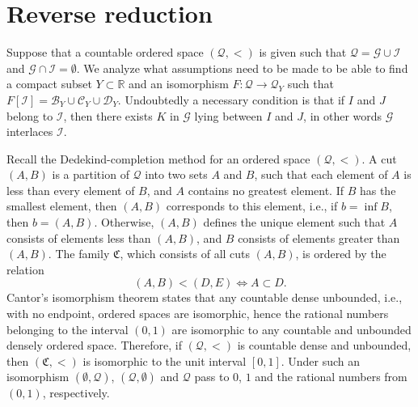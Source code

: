 \documentclass[12pt,a4paper,leqno]{amsart}
\theoremstyle{definition}
\begin{document}
   \section{Reverse reduction} 
  Suppose that a countable  ordered space $(\mathcal Q, <)$ is given such that $\mathcal Q = \mathcal G \cup \mathcal I$ and 
$\mathcal G \cap \mathcal I =\emptyset$. We analyze what assumptions need to be made to be able to find a compact subset $Y\subset \mathbb R$ and an isomorphism $F: \mathcal Q \to \mathcal Q_Y$ such that  $ F[\mathcal I] =\mathcal B_Y \cup \mathcal C_Y \cup \mathcal D_Y$. Undoubtedly a necessary condition is that    if $I$ and $J$ belong to $\mathcal I$, then there exists $K$ in $\mathcal G$ lying between $I$ and $J$, in other words $\mathcal G$ interlaces $\mathcal I$. 

  Recall the Dedekind-completion method for  an ordered space  
$(\mathcal Q, <)$. A cut $(A,B)$ is a partition of $\mathcal Q$ into two sets $A$ and $B$, such that each element of $A$ is less than every element of $B$, and $A$ contains no greatest element.  If $B$ has the smallest element, then   $(A,B)$ corresponds to this element, 
i.e., if $b=\inf B$, then $b=(A,B)$. Otherwise, $(A,B)$ defines the unique element such that  $A$ consists of  elements  less than $(A,B)$, and $B$ consists of   elements  greater than  $(A,B)$. The family $\mathfrak C$,  which consists of all cuts $(A,B)$, is  ordered by the relation $$ (A,B)<(D,E) \Leftrightarrow A\subset D.$$ 
 Cantor's isomorphism theorem states that any countable dense unbounded, i.e., with no endpoint,  ordered spaces are isomorphic, hence the rational numbers belonging to the interval $(0,1)$ are isomorphic to any countable and unbounded densely ordered space. Therefore, if $(\mathcal Q, <)$ is countable   dense and unbounded, then $(\mathfrak C, <)$ is isomorphic to the unit interval $[0,1]$. Under such an isomorphism  $(\emptyset, \mathcal Q)$,  $(\mathcal Q, \emptyset)$
and $\mathcal Q$ pass to $0$, $1$ and the rational numbers from $(0,1)$, respectively. 
\end{document}
